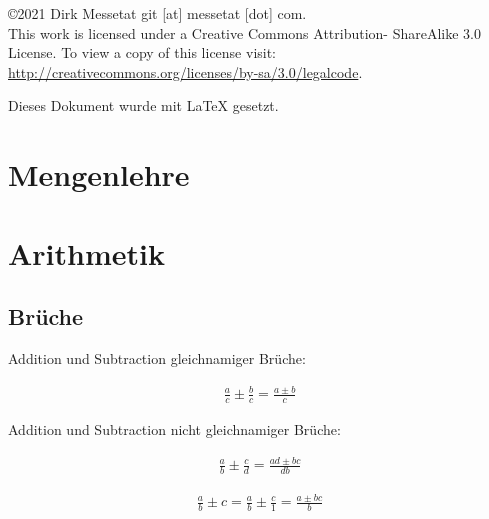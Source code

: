 \documentclass[8pt,a4paper,fleqn]{article}
\begin{document}
\maketitle
\thispagestyle{empty}


\vfill
 

\begin{flushright}
    \copyright  2021 Dirk Messetat git [at] messetat [dot] com. \\
    This work is licensed under a Creative Commons Attribution- ShareAlike 3.0 License.
    To view a copy of this license visit:
     \url{http://creativecommons.org/licenses/by-sa/3.0/legalcode}.
\end{flushright}

\pagebreak



\tableofcontents
\thispagestyle{empty}


\vfill

\begin{center}
\small{Dieses Dokument wurde mit \LaTeX{} gesetzt.}
\end{center}

%
\newpage
%

\clearpage
{} 

\section{Mengenlehre}
\section{Arithmetik}
\subsection{Brüche}

Addition und Subtraction gleichnamiger Brüche:

\begin{align*}
  \frac{a}{c} \pm \frac{b}{c} =  \frac{a \pm b}{c} 
\end{align*}

Addition und Subtraction nicht gleichnamiger Brüche:

\begin{align*}
\frac{a}{b} \pm \frac{c}{d} = \frac{ad \pm bc}{db} 
\end{align*}

\begin{align*}
\frac{a}{b} \pm c = \frac{a}{b} \pm \frac{c}{1} = \frac{a \pm bc}{b} 
\end{align*}
\end{document}
